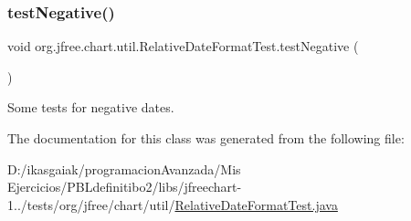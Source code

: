\subsubsection{\texorpdfstring{test\+Negative()}{testNegative()}}
{\footnotesize\ttfamily void org.\+jfree.\+chart.\+util.\+Relative\+Date\+Format\+Test.\+test\+Negative (\begin{DoxyParamCaption}{ }\end{DoxyParamCaption})}

Some tests for negative dates. 

The documentation for this class was generated from the following file\+:\begin{DoxyCompactItemize}
\item 
D\+:/ikasgaiak/programacion\+Avanzada/\+Mis Ejercicios/\+P\+B\+Ldefinitibo2/libs/jfreechart-\/1../tests/org/jfree/chart/util/\mbox{\hyperlink{_relative_date_format_test_8java}{Relative\+Date\+Format\+Test.\+java}}\end{DoxyCompactItemize}
